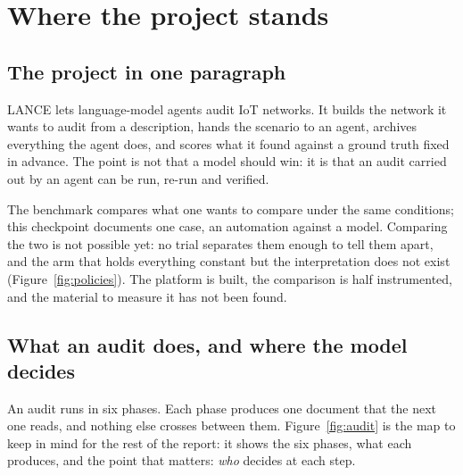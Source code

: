 \section{Where the project stands}
\label{sec:etat}

\subsection{The project in one paragraph}

LANCE lets language-model agents audit IoT networks. It builds the network it
wants to audit from a description, hands the scenario to an agent, archives everything the agent does, and scores what it found against a
ground truth fixed in advance. The point is not that a model should win: it is
that an audit carried out by an agent can be run, re-run and verified.



The benchmark compares what one wants to compare under the same conditions; this
checkpoint documents one case, an automation against a model. Comparing the two is
not possible yet: no trial separates them enough to tell them apart, and the arm
that holds everything constant but the interpretation does not exist
(Figure~\ref{fig:policies}). The platform is built, the comparison is half
instrumented, and the material to measure it has not been found.

\subsection{What an audit does, and where the model decides}
\label{sec:parcours}

An audit runs in six phases. Each phase produces one document that the next one
reads, and nothing else crosses between them. Figure~\ref{fig:audit} is the map to
keep in mind for the rest of the report: it shows the six phases, what each
produces, and the point that matters: \emph{who} decides at each step.

